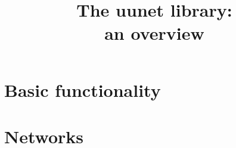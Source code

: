 \documentclass[11pt,a5paper,footinclude=true,headinclude=true]{scrbook} %
\title{The uunet library:\\an overview}
\theoremstyle{definition}
\begin{document}
	
	\maketitle
	
	\tableofcontents 


\cleardoublepage



\cleardoublepage\part{Basic functionality}




    
\cleardoublepage\part{Networks}
\label{part:networks}




    










%	

    
\end{document}
